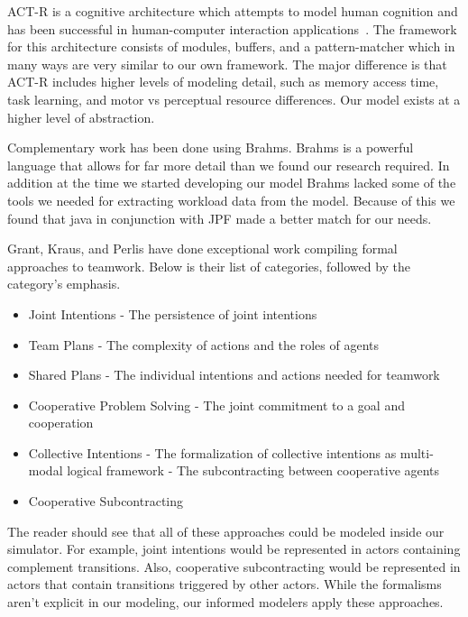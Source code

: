 ACT-R is a cognitive architecture which attempts to model human cognition and
has been successful in human-computer interaction applications~\cite{anderson2004integrated,lebiere2013cognitive}.  The
framework for this architecture consists of modules, buffers, and a pattern-matcher which in many ways are very similar to our own framework.  The major
difference is that ACT-R includes higher levels of modeling detail, such as memory access
time, task learning, and motor vs perceptual resource differences.  Our model exists at a higher level of abstraction.

Complementary work has been done using Brahms. Brahms is a powerful language that allows for far more detail than we found our research required. In addition at the time we started developing our model Brahms lacked some of the tools we needed for extracting workload data from the model. Because of this we found that java in conjunction with JPF made a better match for our needs.

Grant, Kraus, and Perlis have done exceptional work compiling formal approaches
to teamwork. Below is their list of categories, followed by the category's
emphasis.
\begin{itemize}
	\item Joint Intentions - The persistence of joint intentions
	\item Team Plans - The complexity of actions and the roles of agents
	\item Shared Plans - The individual intentions and actions needed for teamwork
	\item Cooperative Problem Solving - The joint commitment to a goal and
	cooperation
	\item Collective Intentions - The formalization of collective intentions as
	multi-modal logical framework - The subcontracting between cooperative agents
	\item Cooperative Subcontracting 
\end{itemize}
The reader should see that all of these approaches could be modeled inside our
simulator. For example, joint intentions would be represented in actors
containing complement transitions. Also, cooperative subcontracting would be
represented in actors that contain transitions triggered by other actors. While
the formalisms aren't explicit in our modeling, our informed modelers apply
these approaches.
